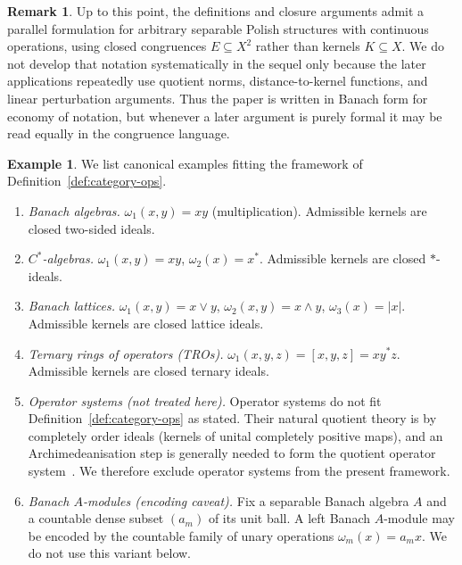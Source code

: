 \documentclass[12pt,fleqn,a4paper]{amsart}
\numberwithin{equation}{section}
\theoremstyle{definition}
\newtheorem{remark}[theorem]{Remark}
\newtheorem{example}[theorem]{Example}
\begin{document}
\begin{remark}
\label{rem:banach-form-vs-congruence}
Up to this point, the definitions and closure arguments admit a parallel
formulation for arbitrary separable Polish structures with continuous operations,
using closed congruences $E\subseteq X^2$ rather than kernels $K\subseteq X$.
We do not develop that notation systematically in the sequel only because the
later applications repeatedly use quotient norms, distance-to-kernel functions,
and linear perturbation arguments.  Thus the paper is written in Banach form for
economy of notation, but whenever a later argument is purely formal it may be read
equally in the congruence language.
\end{remark}

\begin{example}\label{ex:standard-cats}
We list canonical examples fitting the framework of
Definition~\ref{def:category-ops}.

\begin{enumerate}
\item \emph{Banach algebras.}  $\omega_1(x,y)=xy$ (multiplication).
Admissible kernels are closed two-sided ideals.

\item \emph{$C^*$-algebras.}  $\omega_1(x,y)=xy$, $\omega_2(x)=x^*$.
Admissible kernels are closed $*$-ideals.

\item \emph{Banach lattices.}
$\omega_1(x,y)=x\vee y$, $\omega_2(x,y)=x\wedge y$, $\omega_3(x)=|x|$.
Admissible kernels are closed lattice ideals.

\item \emph{Ternary rings of operators (TROs).}
$\omega_1(x,y,z)=[x,y,z]=xy^*z$.
Admissible kernels are closed ternary ideals.

\item \emph{Operator systems (not treated here).}
Operator systems do not fit Definition~\ref{def:category-ops} as stated.
Their natural quotient theory is by completely order ideals (kernels of unital
completely positive maps), and an Archimedeanisation step is generally needed to
form the quotient operator system~\cite{KPTT}.  We therefore exclude operator
systems from the present framework.

\item \emph{Banach $A$-modules (encoding caveat).}
Fix a separable Banach algebra $A$ and a countable dense subset
$(a_m)$ of its unit ball.
A left Banach $A$-module may be encoded by the countable family of
unary operations $\omega_m(x)=a_mx$.  We do not use this variant below.


\end{enumerate}
\end{example}
\end{document}

